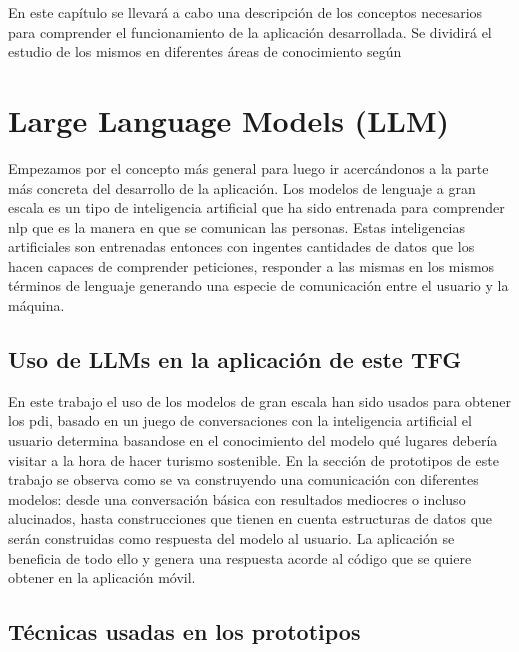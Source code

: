 
En este capítulo se llevará a cabo una descripción de los conceptos necesarios para comprender el funcionamiento de la aplicación desarrollada. Se dividirá el estudio de los mismos en diferentes áreas de conocimiento según 



\section{Large Language Models (LLM)}

Empezamos por el concepto más general para luego ir acercándonos a la parte más concreta del desarrollo de la aplicación. Los modelos de lenguaje a gran escala es un tipo de inteligencia artificial que ha sido entrenada para comprender \acrfull{nlp} que es la manera en que se comunican las personas. Estas inteligencias artificiales son entrenadas entonces con ingentes cantidades de datos que los hacen capaces de comprender peticiones, responder a las mismas en los mismos términos de lenguaje generando una especie de comunicación entre el usuario y la máquina.



\subsection{Uso de LLMs en la aplicación de este TFG}

En este trabajo el uso de los modelos de gran escala han sido usados para obtener los \acrfull{pdi}, basado en un juego de conversaciones con la inteligencia artificial el usuario determina basandose en el conocimiento del modelo qué lugares debería visitar a la hora de hacer turismo sostenible.
En la sección de prototipos de este trabajo se observa como se va construyendo una comunicación con diferentes modelos: desde una conversación básica con resultados mediocres o incluso alucinados, hasta construcciones que tienen en cuenta estructuras de datos que serán construidas como respuesta del modelo al usuario. La aplicación se beneficia de todo ello y genera una respuesta acorde al código que se quiere obtener en la aplicación móvil.
\subsection{Técnicas usadas en los prototipos}
